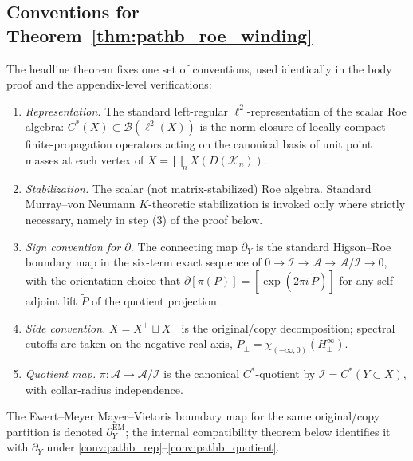 \documentclass[11pt]{article}
\numberwithin{equation}{section}
\theoremstyle{definition}
\theoremstyle{remark}
\newcommand{\K}{\mathcal{K}}
\begin{document}
\subsection{Conventions for Theorem~\ref{thm:pathb_roe_winding}}\label{sec:pathb_conventions}
The headline theorem fixes one set of conventions, used identically in the body proof and the
appendix-level verifications:
\begin{enumerate}[label=(C\arabic*),leftmargin=2.4em]
\item\label{conv:pathb_rep} \emph{Representation.} The standard left-regular
\(\ell^2\)-representation of the scalar Roe algebra: \(C^*(X)\subset\mathcal B(\ell^2(X))\) is the
norm closure of locally compact finite-propagation operators acting on the canonical basis of unit
point masses at each vertex of $X=\bigsqcup_n X(D(\K_n))$.
\item\label{conv:pathb_stab} \emph{Stabilization.} The scalar (not matrix-stabilized) Roe algebra.
Standard Murray--von Neumann \(K\)-theoretic stabilization is invoked only where strictly
necessary, namely in step (3) of the proof below.
\item\label{conv:pathb_sign} \emph{Sign convention for \(\partial\).} The connecting map
\(\partial_Y\) is the standard Higson--Roe boundary map in the six-term exact sequence of
\(0\to\mathcal I\to\mathcal A\to\mathcal A/\mathcal I\to0\), with the orientation choice that
\(\partial[\pi(P)]=[\exp(2\pi i\,\tilde P)]\) for any self-adjoint lift \(\tilde P\) of the
quotient projection \cite{HigsonRoeI,RoeLectures}.
\item\label{conv:pathb_side} \emph{Side convention.} \(X=X^+\sqcup X^-\) is the original/copy
decomposition; spectral cutoffs are taken on the negative real axis,
\(P_\pm=\chi_{(-\infty,0)}(H_\pm^\infty)\).
\item\label{conv:pathb_quotient} \emph{Quotient map.} \(\pi:\mathcal A\to\mathcal A/\mathcal I\) is
the canonical \(C^*\)-quotient by \(\mathcal I=C^*(Y\subset X)\), with collar-radius independence.
\end{enumerate}
The Ewert--Meyer Mayer--Vietoris boundary map for the same original/copy partition is denoted
\(\partial^{\mathrm{EM}}_Y\); the internal compatibility theorem below identifies it with
\(\partial_Y\) under \ref{conv:pathb_rep}--\ref{conv:pathb_quotient}.
\end{document}
